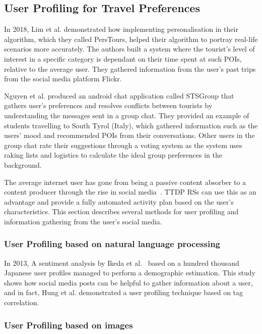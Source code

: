 
\subsection{User Profiling for Travel Preferences}

In 2018, Lim et al.\cite{Lim2018a}  demonstrated how implementing
personalisation in their algorithm, which they called PersTours, helped their
algorithm to portray 
real-life scenarios more accurately. The authors built a system where the
tourist's level of interest in a specific category is dependant on their time
spent at such POIs, relative to the average user. They gathered information
from the user's past trips from the social media platform Flickr.


Nguyen et al.\cite{Nguyen2018} produced an android chat application called STSGroup that
gathers user's preferences and resolves conflicts between tourists by
understanding the messages sent in a group chat. They provided an example of
students travelling to South Tyrol (Italy), which gathered information such as
the users' mood and recommended POIs from their conversations. Other users in
the group chat rate their suggestions through a voting system as the system
uses raking lists and logistics to calculate the ideal group preferences in the
background. 

The average internet user has gone from being a passive content absorber to a
content producer through the rise in social media~\cite{Ikeda}. TTDP RSs can
use this as an advantage and provide a fully automated activity plan based on
the user's characteristics. This section describes several methods for user
profiling and information gathering from the user's social media.


\subsubsection{User Profiling based on natural language processing}

In 2013, A sentiment analysis by Ikeda et al.~\cite{Ikeda} based on a hundred thousand
Japanese user profiles managed to perform a demographic estimation. This study
shows how social media posts can be helpful to gather information about a user,
and in fact, Hung et al.\cite{Hung2008} demonstrated a user profiling
technique based on tag correlation.

\subsubsection{User Profiling based on images}


